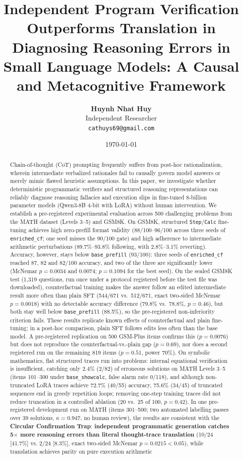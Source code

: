 \documentclass[11pt,a4paper]{article}
\title{\textbf{Independent Program Verification Outperforms Translation in Diagnosing Reasoning Errors in Small Language Models: A Causal and Metacognitive Framework}}
\author{
  \textbf{Huynh Nhat Huy}\\
  Independent Researcher\\
  \texttt{cathuys69@gmail.com}
}
\date{\today}
\begin{document}
\maketitle

\begin{abstract}
Chain-of-thought (CoT) prompting frequently suffers from post-hoc rationalization, wherein intermediate verbalized rationales fail to causally govern model answers or merely mimic flawed heuristic assumptions. In this paper, we investigate whether deterministic programmatic verifiers and structured reasoning representations can reliably diagnose reasoning fallacies and execution slips in fine-tuned 8-billion parameter models (Qwen3-8B 4-bit with LoRA) without human intervention. We establish a pre-registered experimental evaluation across 500 challenging problems from the MATH dataset (Levels 3--5) and GSM8K. On GSM8K, structured \texttt{Step}/\texttt{Calc} fine-tuning achieves high zero-prefill format validity (88/100--96/100 across three seeds of \texttt{enriched\_cf}; one seed misses the 90/100 gate) and high adherence to intermediate arithmetic perturbations (89.7\%--93.8\% following, with 2.8\%--3.1\% reverting). Accuracy, however, stays below \texttt{base\_prefill} (93/100): three seeds of \texttt{enriched\_cf} reached 87, 82 and 82/100 accuracy, and two of the three are significantly lower (McNemar $p = 0.0034$ and $0.0074$; $p = 0.1094$ for the best seed). On the sealed GSM8K test (1,319 questions, run once under a protocol registered before the test file was downloaded), counterfactual training makes the answer follow an edited intermediate result more often than plain SFT (544/671 vs.\ 512/671, exact two-sided McNemar $p = 0.0018$) with no detectable accuracy difference (79.8\% vs.\ 78.8\%, $p = 0.46$), but both stay well below \texttt{base\_prefill} (88.5\%), so the pre-registered non-inferiority criterion fails. These results replicate known effects of counterfactual and plain fine-tuning; in a post-hoc comparison, plain SFT follows edits less often than the base model. A pre-registered replication on 500 GSM-Plus items confirms this ($p = 0.0076$) but does not reproduce the counterfactual-vs.-plain gap ($p = 0.69$), nor does a second registered run on the remaining 819 items ($p = 0.51$, power 70\%). On symbolic mathematics, flat structured traces run into problems: internal equational verification is insufficient, catching only 2.4\% (2/82) of erroneous solutions on MATH Levels 3--5 (items 101--300 under \texttt{base\_showcalc}, false alarm rate 0/118), and although non-truncated LoRA traces achieve 72.7\% (40/55) accuracy, 75.6\% (34/45) of truncated sequences end in greedy repetition loops; removing one-step training traces did not reduce truncation in a controlled ablation (20 vs.\ 25 of 100, $p = 0.42$). In one pre-registered development run on MATH (items 301--500; two automated labelling passes over 39 solutions, $\kappa = 0.947$, no human review), the results are consistent with the \textbf{Circular Confirmation Trap}: \textbf{independent programmatic generation catches 5$\times$ more reasoning errors than literal thought-trace translation} (10/24 [41.7\%] vs. 2/24 [8.3\%], exact two-sided McNemar $p = 0.0215 < 0.05$), while translation achieves parity on pure execution arithmetic 
\end{abstract}
\end{document}
